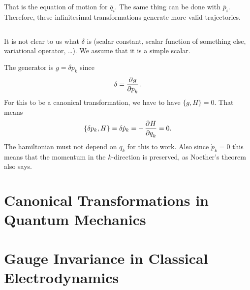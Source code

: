 \documentclass[11pt, ngerman, fleqn, DIV=15, headinclude, BCOR=1cm]{scrartcl}
\begin{document}
That is the equation of motion for $\bar q_i$. The same thing can be done with
$\bar p_i$. Therefore, these infinitesimal transformations generate more valid
trajectories.

\subsection{}

It is not clear to us what $\delta$ is (scalar constant, scalar function of
something else, variational operator, …). We assume that it is a simple scalar.

The generator is $g = \delta p_k$ since
\[
    \delta = \dpd{g}{p_k}.
\]
For this to be a canonical transformation, we have to have $\{g, H\} = 0$. That
means
\[
    \{\delta p_k, H\} = \delta \dot p_k = - \dpd{H}{q_k} = 0.
\]
The hamiltonian must not depend on $q_k$ for this to work. Also since $\dot p_k
= 0$ this means that the momentum in the $k$-direction is preserved, as
Noether's theorem also says.

\section{Canonical Transformations in Quantum Mechanics}

\section{Gauge Invariance in Classical Electrodynamics}
\end{document}
